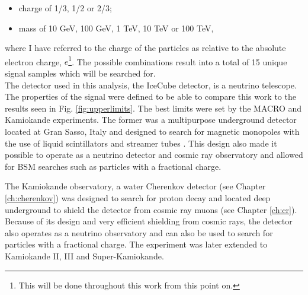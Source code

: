 \begin{itemize}
\item charge of 1/3, 1/2 or 2/3;
\item mass of 10 GeV, 100 GeV, 1 TeV, 10 TeV or 100 TeV,
\end{itemize}

\noindent where I have referred to the charge of the particles as relative to the absolute electron charge, $e$\footnote{This will be done throughout this work from this point on.}. The possible combinations result into a total of 15 unique signal samples which will be searched for.\\

\noindent The detector used in this analysis, the IceCube detector, is a neutrino telescope. The properties of the signal were defined to be able to compare this work to the results seen in Fig. \ref{fig:upperlimits}. The best limits were set by the MACRO and Kamiokande experiments. The former was a multipurpose underground detector located at Gran Sasso, Italy and designed to search for magnetic monopoles with the use of liquid scintillators and streamer tubes \cite{Giacomelli:2007sk}. This design also made it possible to operate as a neutrino detector and cosmic ray observatory and allowed for BSM searches such as particles with a fractional charge.

The Kamiokande observatory, a water Cherenkov detector (see Chapter \ref{ch:cherenkov}) was designed to search for proton decay and located deep underground to shield the detector from cosmic ray muons (see Chapter \ref{ch:cr}). Because of its design and very efficient shielding from cosmic rays, the detector also operates as a neutrino observatory and can also be used to search for particles with a fractional charge. The experiment was later extended to Kamiokande II, III and Super-Kamiokande.  